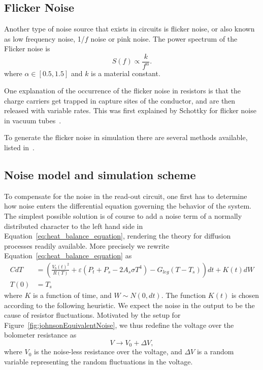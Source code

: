 \subsection{Flicker Noise}\label{sec:flicker-noise}

Another type of noise source that exists in circuits is flicker
noise, or also known as low frequency noise, 1/$f$ noise or pink noise. The power
spectrum of the Flicker noise is
\begin{equation}
  \label{eq:power_spectrum_flicker_noise}
  S(f) \propto \frac{k}{f^{\alpha}}.
\end{equation}
where $\alpha \in [0.5, 1.5]$ and $k$ is a material constant.

One explanation of the occurrence of the flicker noise in resistors is
that the charge carriers get trapped in capture sites of the
conductor, and are then released with variable rates. This was first
explained by Schottky for flicker noise in vacuum tubes~\cite{PhysRev.28.74}.

To generate the flicker noise in simulation there are several methods
available, listed in~\cite{381848}.

\subsection{Noise model and simulation scheme}

To compensate for the noise in the read-out circuit, one first has to
determine how noise enters the differential equation governing the
behavior of the system. The simplest possible solution is of course to
add a noise term of a normally distributed character to the left hand side
in Equation~\eqref{eq:heat_balance_equation}, rendering the theory for
diffusion processes readily available. More precisely we rewrite Equation~\eqref{eq:heat_balance_equation}
as
\begin{align} \label{eq:heat_balance_equation_noise1}
 CdT&=\left(\frac{V_b(t)^2}{R(T)}+\varepsilon(P_t+P_s -2A_s \sigma
      T^4)-G_{leg}(T-T_s)
      \right)dt + K(t)dW \\
 T(0)&=T_s	\nonumber
\end{align}
where $K$ is a function of time, and $W \sim N(0, dt)$.
The function $K(t)$ is chosen according to the following heuristic.
We expect the noise in the output to be the cause of resistor fluctuations.
Motivated by the setup for Figure~\ref{fig:johnsonEquivalentNoise}, we thus redefine the voltage over
the bolometer resistance as
\begin{equation}
  \label{eq:randomvariable_transformation}
  V \rightarrow V_0 + \Delta V,
\end{equation}
where $V_0$ is the noise-less resistance over the voltage, and $\Delta
V$ is a random variable representing the random fluctuations in the
voltage.

